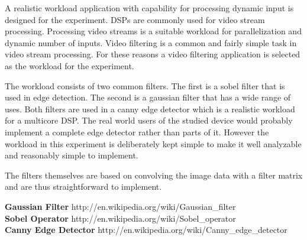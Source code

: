 A realistic workload application with capability for processing dynamic input is designed for the experiment. DSPs are commonly used for video stream processing. Processing video streams is a suitable workload for parallelization and dynamic number of inputs. Video filtering is a common and fairly simple task in video stream processing. For these reasons a video filtering application is selected as the workload for the experiment.

The workload consists of two common filters. The first is a sobel filter that is used in edge detection. The second is a gaussian filter that has a wide range of uses. Both filters are used in a canny edge detector which is a realistic workload for a multicore DSP. The real world users of the studied device would probably implement a complete edge detector rather than parts of it. However the workload in this experiment is deliberately kept simple to make it well analyzable and reasonably simple to implement.

The filters themselves are based on convolving the image data with a filter matrix and are thus straightforward to implement.

\textbf{Gaussian Filter} http://en.wikipedia.org/wiki/Gaussian\_filter\\
\textbf{Sobel Operator} http://en.wikipedia.org/wiki/Sobel\_operator\\
\textbf{Canny Edge Detector} http://en.wikipedia.org/wiki/Canny\_edge\_detector\\